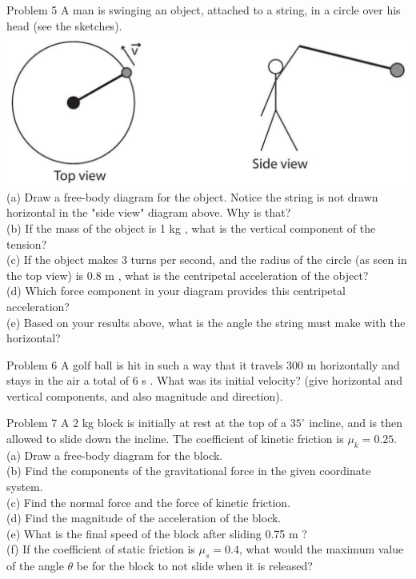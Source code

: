 \documentclass[10pt]{article}
\begin{document}
Problem 5 A man is swinging an object, attached to a string, in a circle over his head (see the sketches).\\
\includegraphics[max width=\textwidth, center]{2024_09_14_9969b06773f10b6936e8g-205}\\
(a) Draw a free-body diagram for the object. Notice the string is not drawn horizontal in the "side view" diagram above. Why is that?\\
(b) If the mass of the object is 1 kg , what is the vertical component of the tension?\\
(c) If the object makes 3 turns per second, and the radius of the circle (as seen in the top view) is 0.8 m , what is the centripetal acceleration of the object?\\
(d) Which force component in your diagram provides this centripetal acceleration?\\
(e) Based on your results above, what is the angle the string must make with the horizontal?

Problem 6 A golf ball is hit in such a way that it travels 300 m horizontally and stays in the air a total of 6 s . What was its initial velocity? (give horizontal and vertical components, and also magnitude and direction).

Problem 7 A 2 kg block is initially at rest at the top of a $35^{\circ}$ incline, and is then allowed to slide down the incline. The coefficient of kinetic friction is $\mu_{k}=0.25$.\\
(a) Draw a free-body diagram for the block.\\
(b) Find the components of the gravitational force in the given coordinate system.\\
(c) Find the normal force and the force of kinetic friction.\\
(d) Find the magnitude of the acceleration of the block.\\
(e) What is the final speed of the block after sliding 0.75 m ?\\
(f) If the coefficient of static friction is $\mu_{s}=0.4$, what would the maximum value of the angle $\theta$ be for the block to not slide when it is released?
\end{document}
